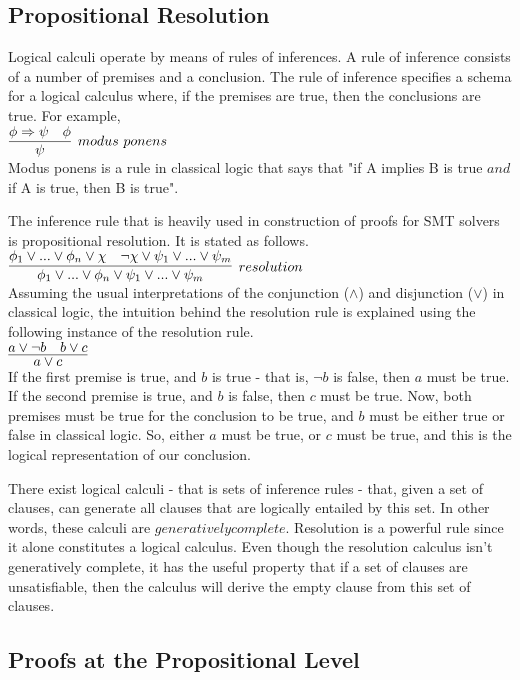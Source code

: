 \documentclass{article}
\begin{document}
\subsection{Propositional Resolution}
\label{sec:res}
Logical calculi operate by means of rules of inferences. A
rule of inference consists of a number of premises and a 
conclusion. The rule of inference specifies a schema for a 
logical calculus where, if the premises are true, then 
the conclusions are true. For example, \\
$\infer[modus\ ponens]{\psi}{\phi \Rightarrow \psi & \phi}$ \\
Modus ponens is a rule in classical logic that says that 
"if A implies B is true $and$ if A is true, then B is true".

The inference rule that is heavily used in construction of 
proofs for SMT solvers is propositional resolution. It is
stated as follows. \\
$\infer[resolution]{\phi_1 \lor ... \lor \phi_n \lor \psi_1 \lor ... \lor \psi_m}
{\phi_1 \lor ... \lor \phi_n \lor \chi & \neg \chi \lor \psi_1 \lor ... \lor \psi_m}$ \\

Assuming the usual interpretations of the conjunction
($\land$) and disjunction ($\lor$) in classical logic, the 
intuition behind the resolution rule is explained using the 
following instance of the resolution rule. \\
$\infer{a \lor c}{a \lor \neg b & b \lor c}$ \\
If the first premise is true, and $b$ is true - that is, 
$\neg b$ is false, then $a$ must be true. If the second 
premise is true, and $b$ is false, then $c$ must be true.
Now, both premises must be true for the conclusion to be true, 
and $b$ must be either true or false in classical logic. 
So, either $a$ must be true, or $c$ must be true, and this 
is the logical representation of our conclusion.

There exist logical calculi - that is sets of inference 
rules - that, given a set of clauses, can generate all 
clauses that are logically entailed by this set. In other 
words, these calculi are $generatively complete$. Resolution 
is a powerful rule since it alone constitutes a logical 
calculus. Even though the resolution calculus 
isn't generatively complete, it has the useful property that 
if a set of clauses are unsatisfiable, then the calculus will 
derive the empty clause from this set of clauses. 


\subsection{Proofs at the Propositional Level}
\label{sec:propproofs}
\end{document}
